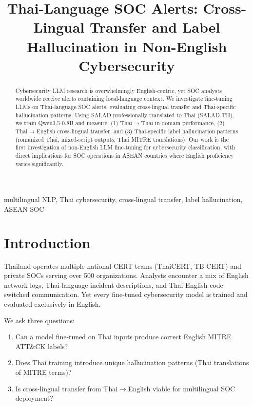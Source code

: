 \documentclass[journal]{IEEEtran}
\begin{document}
\title{Thai-Language SOC Alerts: Cross-Lingual Transfer and Label Hallucination in Non-English Cybersecurity}
\author{}
\maketitle

\begin{abstract}
Cybersecurity LLM research is overwhelmingly English-centric, yet SOC analysts worldwide receive alerts containing local-language context. We investigate fine-tuning LLMs on Thai-language SOC alerts, evaluating cross-lingual transfer and Thai-specific hallucination patterns. Using SALAD professionally translated to Thai (SALAD-TH), we train Qwen3.5-0.8B and measure: (1) Thai$\to$Thai in-domain performance, (2) Thai$\to$English cross-lingual transfer, and (3) Thai-specific label hallucination patterns (romanized Thai, mixed-script outputs, Thai MITRE translations). Our work is the first investigation of non-English LLM fine-tuning for cybersecurity classification, with direct implications for SOC operations in ASEAN countries where English proficiency varies significantly.
\end{abstract}
\begin{IEEEkeywords}
multilingual NLP, Thai cybersecurity, cross-lingual transfer, label hallucination, ASEAN SOC
\end{IEEEkeywords}

\section{Introduction}
Thailand operates multiple national CERT teams (ThaiCERT, TB-CERT) and private SOCs serving over 500 organizations. Analysts encounter a mix of English network logs, Thai-language incident descriptions, and Thai-English code-switched communication. Yet every fine-tuned cybersecurity model is trained and evaluated exclusively in English.

We ask three questions:
\begin{enumerate}
\item Can a model fine-tuned on Thai inputs produce correct English MITRE ATT\&CK labels?
\item Does Thai training introduce unique hallucination patterns (Thai translations of MITRE terms)?
\item Is cross-lingual transfer from Thai$\to$English viable for multilingual SOC deployment?
\end{enumerate}
\end{document}
